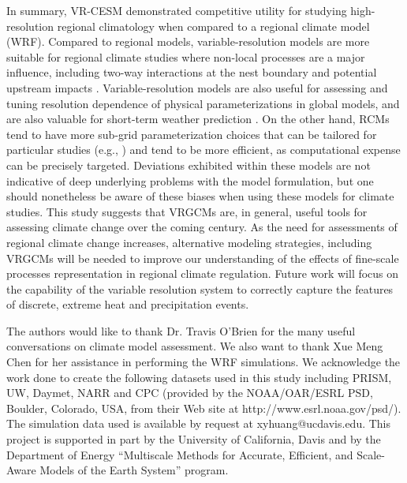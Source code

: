 \documentclass[ms,draft]{agutex}   %
\begin{document}
\begin{article}

In summary, VR-CESM demonstrated competitive utility for studying high-resolution regional climatology when compared to a regional climate model (WRF). Compared to regional models, variable-resolution models are more suitable for regional climate studies where non-local processes are a major influence, including two-way interactions at the nest boundary and potential upstream impacts \citep{sakaguchi2015exploring}.  Variable-resolution models are also useful for assessing and tuning resolution dependence of physical parameterizations in global models, and are also valuable for short-term weather prediction \citep{zarzycki2015experimental}. On the other hand, RCMs tend to have more sub-grid parameterization choices that can be tailored for particular studies (e.g., \citep{cassano2011performance}) and tend to be more efficient, as computational expense can be precisely targeted. Deviations exhibited within these models are not indicative of deep underlying problems with the model formulation, but one should nonetheless be aware of these biases when using these models for climate studies. This study suggests that VRGCMs are, in general, useful tools for assessing climate change over the coming century. As the need for assessments of regional climate change increases, alternative modeling strategies, including VRGCMs will be needed to improve our understanding of the effects of fine-scale processes representation in regional climate regulation. Future work will focus on the capability of the variable resolution system to correctly capture the features of discrete, extreme heat and precipitation events.



\begin{acknowledgments}


The authors would like to thank Dr. Travis O'Brien for the many useful conversations on climate model assessment. We also want to thank Xue Meng Chen for her assistance in performing the WRF simulations. We acknowledge the work done to create the following datasets used in this study including PRISM, UW, Daymet, NARR and CPC (provided by the NOAA/OAR/ESRL PSD, Boulder, Colorado, USA, from their Web site at http://www.esrl.noaa.gov/psd/). The simulation data used is available by request at xyhuang@ucdavis.edu. This project is supported in part by the University of California, Davis and by the Department of Energy ``Multiscale Methods for Accurate, Efficient, and Scale-Aware Models of the Earth System'' program. 
\end{acknowledgments}


\end{article}
\end{document}
